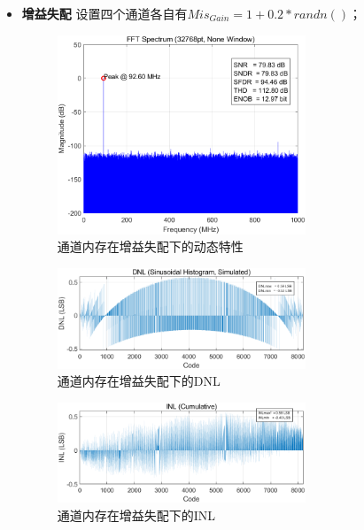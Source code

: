 \documentclass[cs4size,a4paper]{ctexart}
\numberwithin{equation}{section}
\numberwithin{table}{section}
\numberwithin{figure}{section}
\begin{document}
\begin{itemize}
		\item \textbf{增益失配} 设置四个通道各自有$Mis_{Gain} = 1 + 0.2 * randn()$；
		\begin{figure}[H]
			\centering
			\includegraphics[width=0.7\textwidth]{pic/TIG/DFT.png}
			\caption{通道内存在增益失配下的动态特性} 
		\end{figure}

		\begin{figure}[H]
			\centering
			\includegraphics[width=0.7\textwidth]{pic/TIG/DNL.png}
			\caption{通道内存在增益失配下的DNL} 
		\end{figure}

		\begin{figure}[H]
			\centering
			\includegraphics[width=0.7\textwidth]{pic/TIG/INL.png}
			\caption{通道内存在增益失配下的INL} 
		\end{figure}


\end{itemize}
\end{document}
